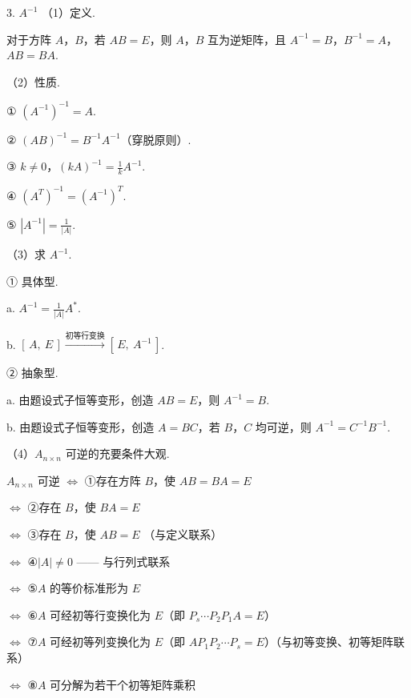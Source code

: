 \begin{fcard}{3. $A^{-1}$}
（1）定义.

对于方阵 $A$，$B$，若 $AB=E$，则 $A$，$B$ 互为逆矩阵，且 $A^{-1}=B$，$B^{-1}=A$，$AB=BA$.

（2）性质.

① $(A^{-1})^{-1}=A$.

② $(AB)^{-1}=B^{-1}A^{-1}$（穿脱原则）.

③ $k\ne0$，$(kA)^{-1}=\frac{1}{k}A^{-1}$.

④ $(A^{T})^{-1}=(A^{-1})^{T}$.

⑤ $|A^{-1}|=\frac{1}{|A|}$.

（3）求 $A^{-1}$.

① 具体型.

a. $A^{-1}=\frac{1}{|A|}A^*$.

b. $[\,A,\ E\,]\xrightarrow{\text{初等行变换}}[\,E,\ A^{-1}\,]$.

② 抽象型.

a. 由题设式子恒等变形，创造 $AB=E$，则 $A^{-1}=B$.

b. 由题设式子恒等变形，创造 $A=BC$，若 $B$，$C$ 均可逆，则 $A^{-1}=C^{-1}B^{-1}$.

（4）$A_{n\times n}$ 可逆的充要条件大观.


$A_{n\times n}$ 可逆 $\Leftrightarrow$ ①存在方阵 $B$，使 $AB=BA=E$

$\Leftrightarrow$ ②存在 $B$，使 $BA=E$

$\Leftrightarrow$ ③存在 $B$，使 $AB=E$ \quad（与定义联系）

$\Leftrightarrow$ ④$|A|\ne0$ —— 与行列式联系

$\Leftrightarrow$ ⑤$A$ 的等价标准形为 $E$

$\Leftrightarrow$ ⑥$A$ 可经初等行变换化为 $E$（即 $P_s\cdots P_2P_1A=E$）

$\Leftrightarrow$ ⑦$A$ 可经初等列变换化为 $E$（即 $AP_1P_2\cdots P_s=E$）\quad（与初等变换、初等矩阵联系）

$\Leftrightarrow$ ⑧$A$ 可分解为若干个初等矩阵乘积



\end{fcard}

